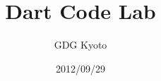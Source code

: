 \documentclass[12pt]{jarticle}
\title{Dart Code Lab}
\author{GDG Kyoto}
\date{2012/09/29}
\begin{document}
\begin{titlepage}
\maketitle
\thispagestyle{empty}
\end{titlepage}
\tableofcontents
\newpage
\end{document}

